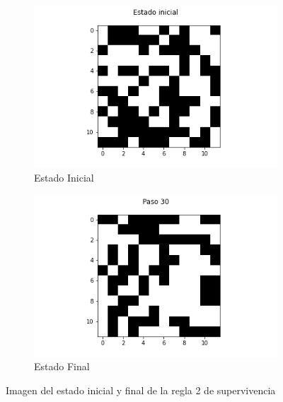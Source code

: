 \documentclass{article}
\begin{document}
\begin{figure}[H]
\centering
\begin{subfigure}[b]{0.45\linewidth}
\includegraphics[width=\linewidth]{p2_r2_t00_p.png}
\caption{Estado Inicial}
\end{subfigure}
\begin{subfigure}[b]{0.45\linewidth}
\includegraphics[width=\linewidth]{p2_r2_t30_p.png}
\caption{Estado Final}
\end{subfigure}
\caption{Imagen del estado inicial y final de la regla 2 de supervivencia}
\label{fig:westminster}
\end{figure}
\end{document}
